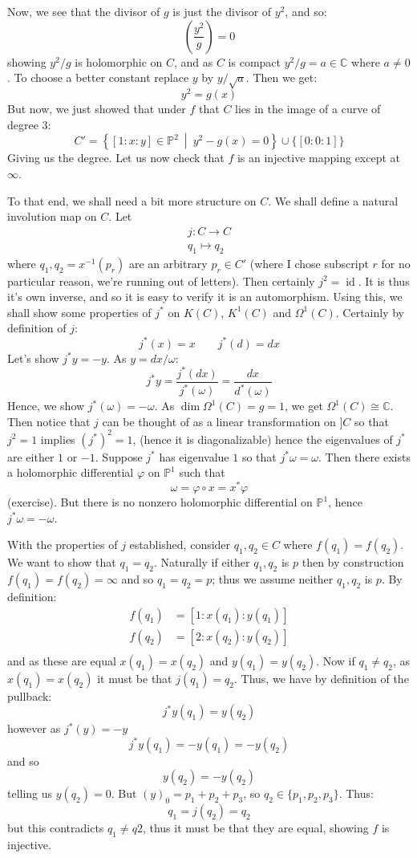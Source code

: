 \documentclass{book}
\newcommand{\C}{{\mathbb{C}}}
\renewcommand{\P}{{\mathbb{P}}}
\newcommand{\id}{{\operatorname{id}}}
\let\temp\phi
\let\phi\varphi
\let\varphi\temp
\newcommand{\set}[2]{\left\{#1 \ \middle|\ #2\right\}}
\begin{document}
\begin{Proof}
  Now, we see that the divisor of $g$ is just the divisor of $y^2$, and so:
  \[
    \left(\frac{y^2}{g}\right) = 0
  \]
  showing $y^2/g$ is holomorphic on $C$, and as $C$ is compact $y^2/g = a\in \C$ where $a\ne 0$. To choose
  a better constant replace $y$ by $y/\sqrt{a}$. Then we get:
  \[
    y^2 = g(x)
  \]
  But now, we just showed that under $f$ that $C$ lies in the image of a curve of degree $3$:
  \[
    C' = \set{[1:x:y] \in \P^2}{y^2-g(x) = 0} \cup \{[0:0:1]\}
  \]
  Giving us the degree. Let us now check that $f$ is an injective mapping except at $\infty$.

  To that end, we shall need a bit more structure on $C$. We shall define a natural involution map on $C$. Let
  \begin{gather*}
    j: C \to C\\
    q_1 \mapsto q_2
  \end{gather*}
  where $q_1, q_2 = x^{-1}(p_r)$ are an arbitrary $p_r \in C'$ (where I chose subscript $r$ for no particular
  reason, we're running out of letters).  Then certainly $j^2 = \id$. It is thus it's own inverse, and so it
  is easy to verify it is an automorphism. Using this, we shall show some properties of $j^*$ on $K(C)$,
  $K^1(C)$ and  $\Omega^1(C)$. Certainly by definition of $j$:
  \[
    j^*(x) = x \qquad j^*(d ) =dx
  \]
  Let's show $j^*y = -y$. As $y = dx/\omega$:\[
    j^*y = \frac{j^*(dx)}{j^*(\omega)}= \frac{dx}{d^*(\omega)}
  \]
  Hence, we show $j^*(\omega) = -\omega$. As $\dim \Omega^1(C) = g= 1$, we get $\Omega^1(C) \cong \C$. Then
  notice that $j$ can be thought of as a linear transformation on $]C$ so that $j^2 = 1$  implies $(j^*)^2 =
  1$, (hence it is diagonalizable) hence the eigenvalues of $j^*$ are either $1$ or $-1$. Suppose $j^*$ has
  eigenvalue $1$ so that $j^*\omega =\omega$. Then there exists a holomorphic differential $\phi$ on $\P^1$ such that
  \[
    \omega = \phi\circ x = x^*\phi
  \]
  (exercise). But there is no nonzero holomorphic differential on $\P^1$, hence $j^*\omega = -\omega$.

  With the properties of $j$ established, consider $q_1, q_2 \in C$ where $f(q_1) = f(q_2)$. We want to show
  that $q_1 = q_2$. Naturally if either $q_1, q_2$ is $p$ then by construction $f(q_1) = f(q_2) = \infty$ and
  so $q_1 = q_2 = p$; thus we assume neither $q_1, q_2$ is $p$. By definition:
  \begin{align*}
    f(q_1) &= [1:x(q_1): y(q_1)]\\
    f(q_2) &= [2:x(q_2): y(q_2)]\\
  \end{align*}
  and as these are equal $x(q_1) = x(q_2)$ and $y(q_1) = y(q_2)$. Now if $q_1 \ne q_2$, as $x(q_1) = x(q_2)$
  it must be that $j(q_1) = q_2$. Thus, we have by definition of the pullback:
  \[
    j^*y(q_1) = y(q_2)
  \]
  however as $j^*(y) = -y$
  \[
    j^*y(q_1) = -y(q_1) = -y(q_2)
  \]
  and so
  \[
    y(q_2) = -y(q_2)
  \]
telling us $y(q_2) = 0$. But $(y)_0 = p_1+p_2+p_3$, so $q_2 \in \{p_1, p_2, p_3\}$. Thus:
\[
  q_1 = j(q_2) = q_2
\]
but this contradicts $q_1 \ne q2$, thus it must be that they are equal, showing $f$ is injective.


\end{Proof}
\end{document}
